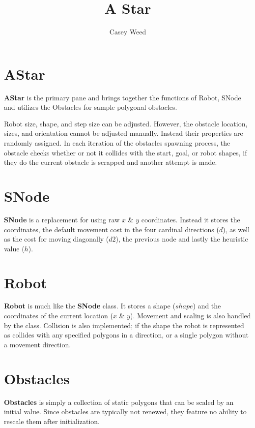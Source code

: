\documentclass[letter,11pt]{article}
\begin{document}
	
	\title{A Star}
	\author{Casey Weed}
	\maketitle
	
	\tableofcontents
	\thispagestyle{empty}
	\pagebreak
	
	\restoregeometry
	\setcounter{page}{1}
	
	\section{AStar}
	
	\textbf{AStar} is the primary pane and brings together the functions of Robot, SNode and utilizes the Obstacles for sample polygonal obstacles.
	
	Robot size, shape, and step size can be adjusted. However, the obstacle location, sizes, and orientation cannot be adjusted manually. Instead their properties are randomly assigned. In each iteration of the obstacles spawning process, the obstacle checks whether or not it collides with the start, goal, or robot shapes, if they do the current obstacle is scrapped and another attempt is made.
	
	
	
	\section{SNode}
	
	\textbf{SNode} is a replacement for using raw $x$ \& $y$ coordinates. Instead it stores the coordinates, the default movement cost in the four cardinal directions ($d$), as well as the cost for moving diagonally ($d2$), the previous node and lastly the heuristic value ($h$).
	
	
	
	\section{Robot}
	
	\textbf{Robot} is much like the \textbf{SNode} class. It stores a shape ($shape$) and the coordinates of the current location ($x$ \& $y$). Movement and scaling is also handled  by the class. Collision is also implemented; if the shape the robot is represented as collides with any specified polygons in a direction, or a single polygon without a movement direction.
	
	
	
	\section{Obstacles}
	
	\textbf{Obstacles} is simply a collection of static polygons that can be scaled by an initial value. Since obstacles are typically not renewed, they feature no ability to rescale them after initialization.
	
	
\end{document}
